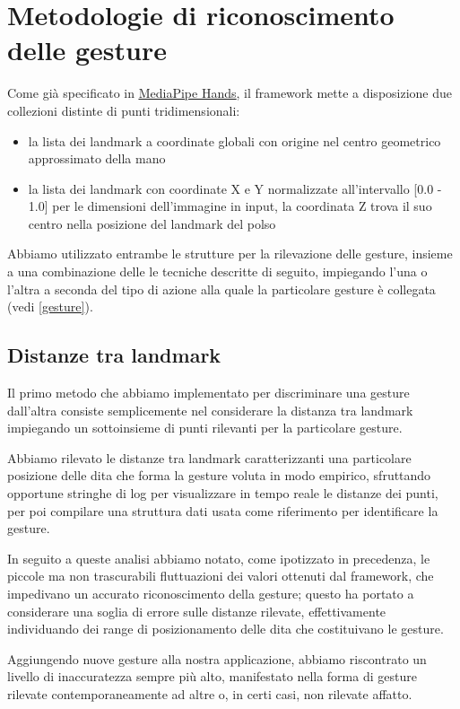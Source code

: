 \chapter{Metodologie di riconoscimento delle gesture}
\label{chap:metodi}

Come già specificato in \hyperref[chap:landmarks]{\underline{MediaPipe Hands}}, il framework mette a disposizione due collezioni distinte di punti tridimensionali: 
\begin{itemize}
    \item la lista dei landmark a coordinate globali con origine nel centro geometrico approssimato della mano
    \item la lista dei landmark con coordinate X e Y normalizzate all'intervallo [0.0 - 1.0] per le dimensioni dell'immagine in input, la coordinata Z trova il suo centro nella posizione del landmark del polso
\end{itemize}

\noindent Abbiamo utilizzato entrambe le strutture per la rilevazione delle gesture, insieme a una combinazione delle le tecniche descritte di seguito, impiegando l'una o l'altra a seconda del tipo di azione alla quale la particolare gesture è collegata (vedi \ref{gesture}).

\section{Distanze tra landmark}

Il primo metodo che abbiamo implementato per discriminare una gesture dall'altra consiste semplicemente nel considerare la distanza tra landmark impiegando un sottoinsieme di punti rilevanti per la particolare gesture.

Abbiamo rilevato le distanze tra landmark caratterizzanti una particolare posizione delle dita che forma la gesture voluta in modo empirico, sfruttando opportune stringhe di log per visualizzare in tempo reale le distanze dei punti, per poi compilare una struttura dati usata come riferimento per identificare la gesture.

In seguito a queste analisi abbiamo notato, come ipotizzato in precedenza, le piccole ma non trascurabili fluttuazioni dei valori ottenuti dal framework, che impedivano un accurato riconoscimento della gesture; questo ha portato a considerare una soglia di errore sulle distanze rilevate, effettivamente individuando dei range di posizionamento delle dita che costituivano le gesture.

Aggiungendo nuove gesture alla nostra applicazione, abbiamo riscontrato un livello di inaccuratezza sempre più alto, manifestato nella forma di gesture rilevate contemporaneamente ad altre o, in certi casi, non rilevate affatto.


